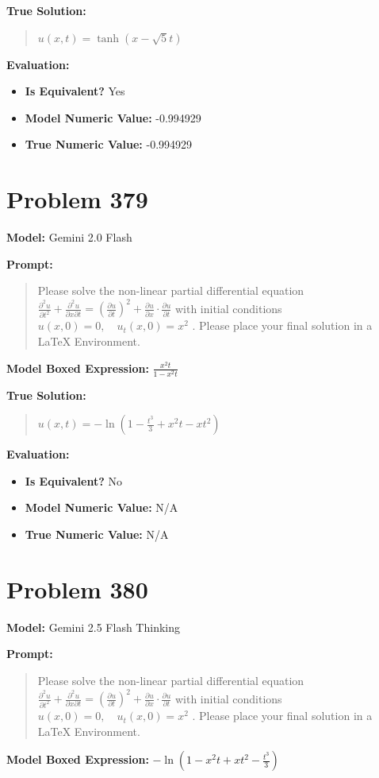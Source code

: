 \documentclass{article}
\begin{document}
{\textbf{True Solution:}
\begin{quote}
$u(x,t)=\tanh(x-\sqrt{5}t)$
\end{quote}

\textbf{Evaluation:}
\begin{itemize}
\item \textbf{Is Equivalent?} Yes
\item \textbf{Model Numeric Value:} -0.994929
\item \textbf{True Numeric Value:} -0.994929
\end{itemize}
\vspace{1cm}
\section*{Problem 379}
\textbf{Model:} Gemini 2.0 Flash

\textbf{Prompt:}
\begin{quote}
Please solve the non-linear partial differential equation $\frac{\partial^2 u}{\partial t^2}+ \frac{\partial^2 u}{\partial x \partial t}= \left( \frac{\partial u}{\partial t} \right)^2+ \frac{\partial u}{\partial x} \cdot \frac{\partial u}{\partial t}$ with initial conditions $u(x, 0) = 0, \quad u_t(x, 0) = x^2$ . Please place your final solution in a $\boxed{}$ LaTeX Environment.
\end{quote}
\textbf{Model Boxed Expression:} $\frac{x^2 t}{1 - x^2 t}$

\textbf{True Solution:}
\begin{quote}
$u(x, t) = -\ln\left(1 - \frac{t^3}{3} + x^2 t - x t^2\right)$
\end{quote}

\textbf{Evaluation:}
\begin{itemize}
\item \textbf{Is Equivalent?} No
\item \textbf{Model Numeric Value:} N/A
\item \textbf{True Numeric Value:} N/A
\end{itemize}
\vspace{1cm}
\section*{Problem 380}
\textbf{Model:} Gemini 2.5 Flash Thinking

\textbf{Prompt:}
\begin{quote}
Please solve the non-linear partial differential equation $\frac{\partial^2 u}{\partial t^2}+ \frac{\partial^2 u}{\partial x \partial t}= \left( \frac{\partial u}{\partial t} \right)^2+ \frac{\partial u}{\partial x} \cdot \frac{\partial u}{\partial t}$ with initial conditions $u(x, 0) = 0, \quad u_t(x, 0) = x^2$ . Please place your final solution in a $\boxed{}$ LaTeX Environment.
\end{quote}
\textbf{Model Boxed Expression:} $-\ln\left(1 - x^2t + xt^2 - \frac{t^3}{3}\right)$

}
\end{document}
